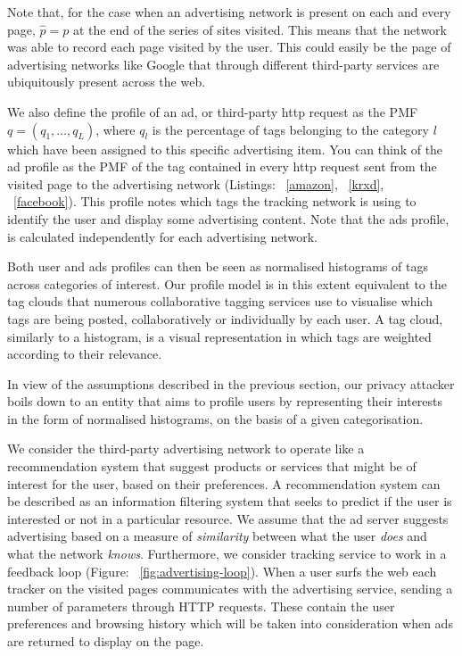 Note that, for the case when an advertising network is present on each and every page, $\hat{p} = p$ at the end of the series of sites visited. This means that the network was able to record each page visited by the user. This could easily be the page of advertising networks like Google that through different third-party services are ubiquitously present across the web.

We also define the profile of an ad, or third-party http request as the PMF $q =(q_1,\ldots, q_L)$, where $q_l$ is the percentage of tags belonging to the category $l$ which have been assigned to this specific advertising item. You can think of the ad profile as the PMF of the tag contained in every http request sent from the visited page to the advertising network (Listings: ~\ref{amazon}, ~\ref{krxd}, ~\ref{facebook}). This profile notes which tags the tracking network is using to identify the user and display some advertising content. Note that the ads profile, is calculated independently for each advertising network.

Both user and ads profiles can then be seen as normalised histograms of tags across categories of interest. Our profile model is in this extent equivalent to the tag clouds that numerous collaborative tagging services use to visualise which tags are being posted, collaboratively or individually by each user. A tag cloud, similarly to a histogram, is a visual representation in which tags are weighted according to their relevance.

In view of the assumptions described in the previous section, our privacy attacker boils down to an entity that aims to profile users by representing their interests in the form of normalised histograms, on the basis of a given categorisation.

We consider the third-party advertising network to operate like a recommendation system that suggest products or services that might be of interest for the user, based on their preferences. A recommendation system can be described as an information filtering system that seeks to predict if the user is interested or not in a particular resource. We assume that the ad server suggests advertising based on a measure of \emph{similarity} between what the user \emph{does} and what the network \emph{knows}. Furthermore, we consider tracking service to work in a feedback loop (Figure: ~\ref{fig:advertising-loop}). When a user surfs the web each tracker on the visited pages communicates with the advertising service, sending a number of parameters through HTTP requests. These contain the user preferences and browsing history which will be taken into consideration when ads are returned to display on the page. 

